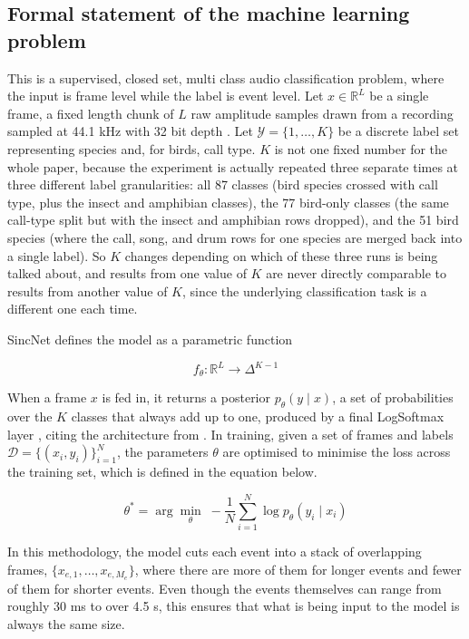 \documentclass[11pt]{article}
\begin{document}
\subsection{Formal statement of the machine learning problem}

This is a supervised, closed set, multi class audio classification problem, where the input is frame level while the label is event level. Let $x \in \mathbb{R}^{L}$ be a single frame, a fixed length chunk of $L$ raw amplitude samples drawn from a recording sampled at 44.1 kHz with 32 bit depth \citep{bravosanchez2021}. Let $\mathcal{Y} = \{1, \dots, K\}$ be a discrete label set representing species and, for birds, call type. $K$ is not one fixed number for the whole paper, because the experiment is actually repeated three separate times at three different label granularities: all 87 classes (bird species crossed with call type, plus the insect and amphibian classes), the 77 bird-only classes (the same call-type split but with the insect and amphibian rows dropped), and the 51 bird species (where the call, song, and drum rows for one species are merged back into a single label). So $K$ changes depending on which of these three runs is being talked about, and results from one value of $K$ are never directly comparable to results from another value of $K$, since the underlying classification task is a different one each time.

SincNet defines the model as a parametric function

\begin{equation}
f_\theta : \mathbb{R}^{L} \to \Delta^{K-1}
\end{equation}

When a frame $x$ is fed in, it returns a posterior $p_\theta(y \mid x)$, a set of probabilities over the $K$ classes that always add up to one, produced by a final LogSoftmax layer \cite{bravosanchez2021}, citing the architecture from \cite{ravanelli2018}. In training, given a set of frames and labels $\mathcal{D} = \{(x_i, y_i)\}_{i=1}^{N}$, the parameters $\theta$ are optimised to minimise the loss across the training set, which is defined in the equation below.

\begin{equation}
\theta^{*} = \arg\min_{\theta} \; -\frac{1}{N}\sum_{i=1}^{N} \log p_\theta(y_i \mid x_i)
\end{equation}

In this methodology, the model cuts each event into a stack of overlapping frames, $\{x_{e,1}, \dots, x_{e,M_e}\}$, where there are more of them for longer events and fewer of them for shorter events. Even though the events themselves can range from roughly 30 ms to over 4.5 s, this ensures that what is being input to the model is always the same size.
\end{document}
